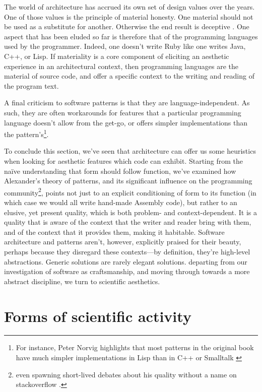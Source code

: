 The world of architecture has accrued its own set of design values over the years. One of those values is the principle of material honesty. One material should not be used as a substitute for another. Otherwise the end result is deceptive \citep{keith_resilient_2016}. One aspect that has been eluded so far is therefore that of the programming languages used by the programmer. Indeed, one doesn't write Ruby like one writes Java,  C++, or Lisp. If materiality is a core component of eliciting an aesthetic experience in an architectural context, then programming languages are the material of source code, and offer a specific context to the writing and reading of the program text.

A final criticism to software patterns is that they are language-independent. As such, they are often workarounds for features that a particular programming language doesn't allow from the get-go, or offers simpler implementations than the pattern's\footnote{For instance, Peter Norvig highlights that most patterns in the original book have much simpler implementations in Lisp than in C++ or Smalltalk \citep{norvig_design_1998}}.

To conclude this section, we've seen that architecture can offer us some heuristics when looking for aesthetic features which code can exhibit. Starting from the naïve understanding that form should follow function, we've examined how Alexander's theory of patterns, and its significant influence on the programming community\footnote{even spawning short-lived debates about his quality without a name on stackoverflow \citep{interstar_quality_2017}.}, points not just to an explicit conditioning of form to its function (in which case we would all write hand-made Assembly code), but rather to an elusive, yet present quality, which is both problem- and context-dependent. It is a quality that is aware of the context that the writer and reader bring with them, and of the context that it provides them, making it habitable. Software architecture and patterns aren't, however, explicitly praised for their beauty, perhaps because they disregard these contexts—by definition, they're high-level abstractions. Generic solutions are rarely elegant solutions. departing from our investigation of software as craftsmanship, and moving through towards a more abstract discipline, we turn to scientific aesthetics.

\section{Forms of scientific activity}
\label{sec:aesthetic-scientific}

